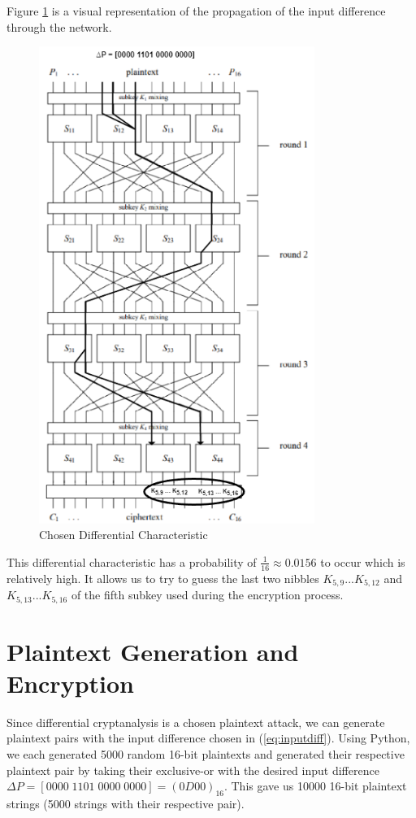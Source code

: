 \documentclass[letterpaper,12pt]{article}
\begin{document}
Figure \ref{fig:dc} is a visual representation of the propagation of the input difference through the network.

\begin{figure}[h]
    \centering
    \includegraphics[width=0.8\textwidth]{sdc.png} %
    \caption{Chosen Differential Characteristic}
    \label{fig:dc} %
\end{figure}

This differential characteristic has a probability of $ \frac{1}{16} \approx 0.0156$ to occur which is relatively high.
It allows us to try to guess the last two nibbles $ K_{5,9} ... K_{5,12} $ and $ K_{5,13} ... K_{5,16}$ of the fifth subkey used during the encryption process.

\clearpage

\section{Plaintext Generation and Encryption}
Since differential cryptanalysis is a chosen plaintext attack, we can generate plaintext pairs with the input difference
chosen in (\ref{eq:inputdiff}). Using Python, we each generated 5000 random 16-bit plaintexts and generated their respective plaintext pair by taking their exclusive-or 
with the desired input difference $ \Delta P = [0000\;1101\;0000\;0000] = (0D00)_{16} $. This gave us 10000 16-bit plaintext strings (5000 strings with their respective pair).
\end{document}
